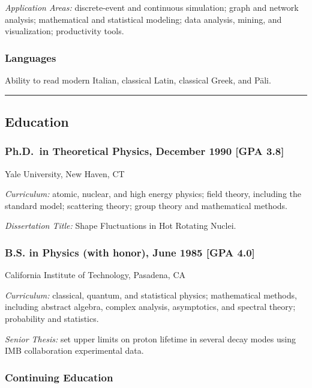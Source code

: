 \documentclass[]{article}
\begin{document}
\emph{Application Areas:} discrete-event and continuous simulation;
graph and network analysis; mathematical and statistical modeling; data
analysis, mining, and visualization; productivity tools.

\subsubsection{Languages}\label{languages}

Ability to read modern Italian, classical Latin, classical Greek, and
Pāli.

\begin{center}\rule{3in}{0.4pt}\end{center}

\subsection{Education}\label{education}

\subsubsection{Ph.D.~in Theoretical Physics, December 1990 {[}GPA
3.8{]}}\label{ph.d.in-theoretical-physics-december-1990-gpa-3.8}

Yale University, New Haven, CT

\emph{Curriculum:} atomic, nuclear, and high energy physics; field
theory, including the standard model; scattering theory; group theory
and mathematical methods.

\emph{Dissertation Title:} Shape Fluctuations in Hot Rotating Nuclei.

\subsubsection{B.S. in Physics (with honor), June 1985 {[}GPA
4.0{]}}\label{b.s.-in-physics-with-honor-june-1985-gpa-4.0}

California Institute of Technology, Pasadena, CA

\emph{Curriculum:} classical, quantum, and statistical physics;
mathematical methods, including abstract algebra, complex analysis,
asymptotics, and spectral theory; probability and statistics.

\emph{Senior Thesis:} set upper limits on proton lifetime in several
decay modes using IMB collaboration experimental data.

\subsubsection{Continuing Education}\label{continuing-education}
\end{document}
